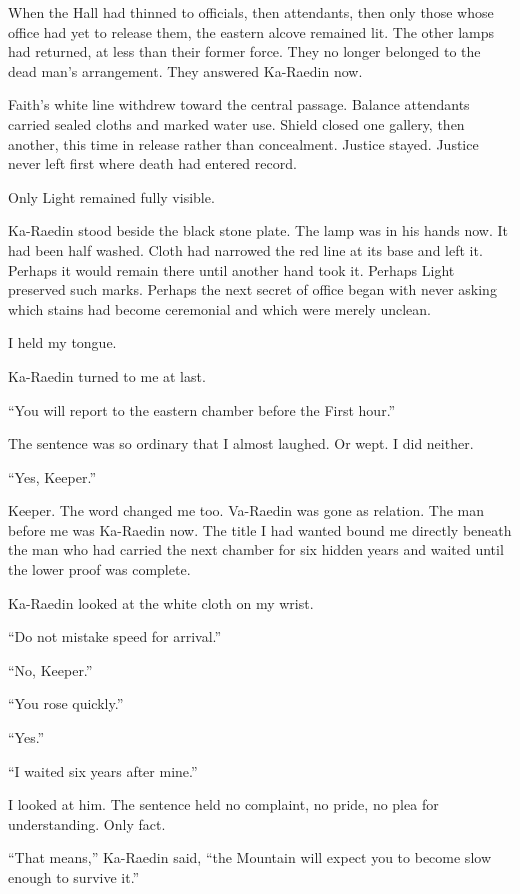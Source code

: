 When the Hall had thinned to officials, then attendants, then only those whose office had yet to release them, the eastern alcove remained lit.
The other lamps had returned, at less than their former force.
They no longer belonged to the dead man's arrangement.
They answered Ka-Raedin now.\par
Faith's white line withdrew toward the central passage.
Balance attendants carried sealed cloths and marked water use.
Shield closed one gallery, then another, this time in release rather than concealment.
Justice stayed.
Justice never left first where death had entered record.\par
Only Light remained fully visible.\par
Ka-Raedin stood beside the black stone plate.
The lamp was in his hands now.
It had been half washed.
Cloth had narrowed the red line at its base and left it.
Perhaps it would remain there until another hand took it.
Perhaps Light preserved such marks.
Perhaps the next secret of office began with never asking which stains had become ceremonial and which were merely unclean.\par
I held my tongue.\par
Ka-Raedin turned to me at last.\par
``You will report to the eastern chamber before the First hour.''\par
The sentence was so ordinary that I almost laughed.
Or wept.
I did neither.\par
``Yes, Keeper.''\par
Keeper.
The word changed me too.
Va-Raedin was gone as relation.
The man before me was Ka-Raedin now.
The title I had wanted bound me directly beneath the man who had carried the next chamber for six hidden years and waited until the lower proof was complete.\par
Ka-Raedin looked at the white cloth on my wrist.\par
``Do not mistake speed for arrival.''\par
``No, Keeper.''\par
``You rose quickly.''\par
``Yes.''\par
``I waited six years after mine.''\par
I looked at him.
The sentence held no complaint, no pride, no plea for understanding.
Only fact.\par
``That means,'' Ka-Raedin said, ``the Mountain will expect you to become slow enough to survive it.''\par
